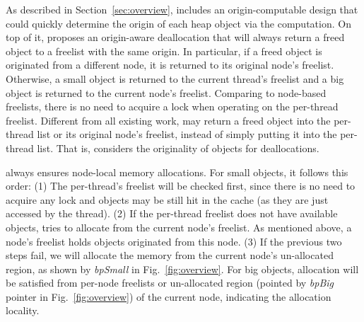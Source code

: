 As described in Section~\ref{sec:overview}, \NM{} includes an origin-computable design that could quickly determine the origin of each heap object via the computation. 
On top of it, \NM{} proposes an origin-aware deallocation that will always return a freed object to a freelist with the same origin. In particular, if a freed object is originated from a different node, it is returned to its original node's  freelist. Otherwise, a small object is returned to the current thread's freelist and a big object is returned to the current node's freelist. Comparing to node-based freelists, there is no need to acquire a lock when operating on the per-thread freelist. Different from all existing work, \NM{} may return a freed object into the per-thread list or its original node's freelist, instead of simply putting it into the per-thread list. That is, \NM{} considers the originality of objects for deallocations. 

\NM{} always ensures node-local memory allocations. For small objects, it follows this order: (1) The per-thread's freelist will be checked first, since there is no need to acquire any lock and objects may be still hit in the cache (as they are just accessed by the thread). (2) If the per-thread freelist does not have available objects, \NM{} tries to allocate from the current node's freelist. As mentioned above, a node's freelist holds objects originated from this node. (3) If the previous two steps fail,  we will allocate the memory from the current node's un-allocated region, as shown by \textit{bpSmall} in Fig.~\ref{fig:overview}. 
For big objects, allocation will be satisfied from per-node freelists or un-allocated region (pointed by \textit{bpBig} pointer in Fig.~\ref{fig:overview}) of the current node, indicating the allocation locality. 
